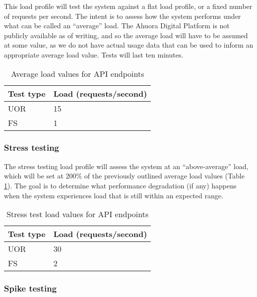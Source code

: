This load profile will test the system against a flat load profile, or a fixed number of requests per second. The intent is to assess how the system performs under what can be called an ``average'' load. The Ahuora Digital Platform is not publicly available as of writing, and so the average load will have to be assumed at some value, as we do not have actual usage data that can be used to inform an appropriate average load value. Tests will last ten minutes.

\begin{table}[h]
    \centering
    \begin{tabularx}{\textwidth}{|X|X|}
        \hline
        \textbf{Test type} & \textbf{Load (requests/second)}  \\ \hline
        UOR & 15 \\ \hline
        FS & 1 \\ \hline
    \end{tabularx}
    \caption{Average load values for API endpoints}
    \label{table:test-average-load-plan}
\end{table}

\subsubsection{Stress testing}

The stress testing load profile will assess the system at an ``above-average'' load, which will be set at 200\% of the previously outlined average load values (Table \ref{table:test-average-load-plan}). The goal is to determine what performance degradation (if any) happens when the system experiences load that is still within an expected range.

\begin{table}[h]
    \centering
    \begin{tabularx}{\textwidth}{|X|X|}
        \hline
        \textbf{Test type} & \textbf{Load (requests/second)}  \\ \hline
        UOR & 30 \\ \hline
        FS & 2 \\ \hline
    \end{tabularx}
    \caption{Stress test load values for API endpoints}
    \label{table:test-stress-load-plan}
\end{table}

\subsubsection{Spike testing}

